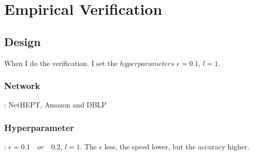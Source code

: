 \documentclass[conference,compsoc]{IEEEtran}
\begin{document}
\section{Empirical Verification}
  \subsection{Design}
    When I do the verification. I set the $hyperparameters$ $\epsilon = 0.1$, $l = 1$.
    \subsubsection{Network}: NetHEPT, Amazon and DBLP
    \subsubsection{Hyperparameter}: $\epsilon = 0.1\quad or\quad 0.2$, $l = 1$. The $\epsilon$ less, the speed lower, but the accuracy higher.
\end{document}
